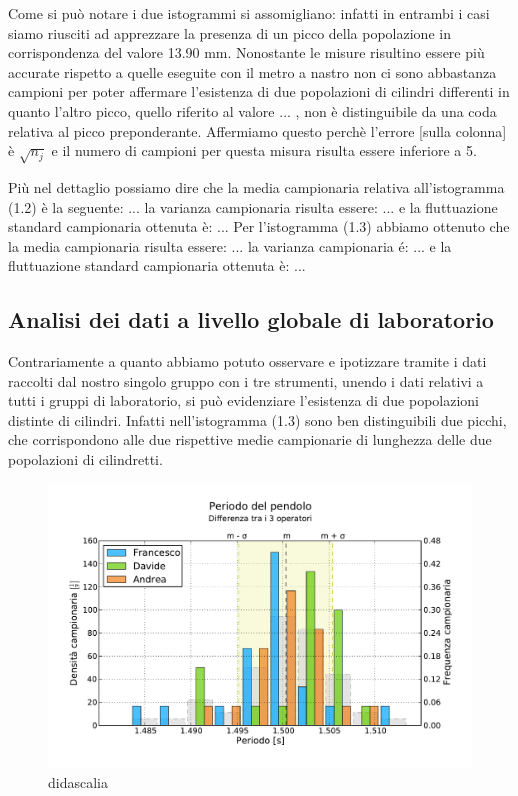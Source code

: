 \documentclass[12pt, twoside, a4paper]{article}
\begin{document}
Come si può notare i due istogrammi si assomigliano: infatti in entrambi i casi siamo riusciti ad apprezzare la presenza di un picco della popolazione in corrispondenza del valore 13.90 mm. Nonostante le misure risultino essere più accurate rispetto a quelle eseguite con il metro a nastro non ci sono abbastanza campioni per poter affermare l'esistenza di due popolazioni di cilindri differenti in quanto l'altro picco, quello riferito al valore ... , non è distinguibile da una coda relativa al picco preponderante. Affermiamo questo perchè l'errore [sulla colonna] è $\sqrt{n_j}$ e il numero di campioni per questa misura risulta essere inferiore a 5.

Più nel dettaglio possiamo dire che la media campionaria relativa all'istogramma (1.2) è la seguente: ...
la varianza campionaria risulta essere: ... e la fluttuazione standard campionaria ottenuta è: ...
Per l'istogramma (1.3) abbiamo ottenuto che la media campionaria risulta essere: ... la varianza campionaria é: ... e la fluttuazione standard campionaria ottenuta è: ...
	\subsection{Analisi dei dati a livello globale di laboratorio}
Contrariamente a quanto abbiamo potuto osservare e ipotizzare tramite i dati raccolti dal nostro singolo gruppo con i tre strumenti, unendo i dati relativi a tutti i gruppi di laboratorio, si può evidenziare l'esistenza di due popolazioni distinte di cilindri. Infatti nell'istogramma (1.3) sono ben distinguibili due picchi, che corrispondono alle due rispettive medie campionarie di lunghezza delle due popolazioni di cilindretti.

\begin{figure}
	\centering
	\includegraphics[width=15cm]{pendolo3.pdf}
	\caption{didascalia}
\end{figure}
\end{document}
